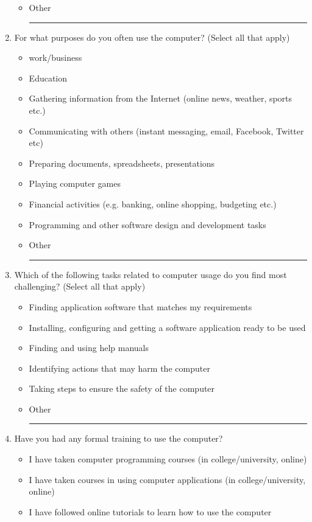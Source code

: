 \begin{enumerate}[topsep=-4em]
\begin{itemize}[topsep=-6em, label={o}]
\item Other \rule{4cm}{0.4pt}
\end{itemize}
\item For what purposes do you often use the computer? (Select all that apply)
\begin{itemize}[topsep=-6em, label={o}]
\itemsep-1em 
\item work/business
\item Education
\item Gathering information from the Internet (online news, weather, sports etc.)
\item Communicating with others (instant messaging, email, Facebook, Twitter etc)
\item Preparing documents, spreadsheets, presentations
\item Playing computer games
\item Financial activities (e.g. banking, online shopping, budgeting etc.)
\item Programming and other software design and development tasks
\item Other \rule{4cm}{0.4pt}
\end{itemize}
\item Which of the following tasks related to computer usage do you find most challenging? (Select all that apply)
\begin{itemize}[topsep=-6em, label={o}]
\itemsep-1em 
\item Finding application software that matches my requirements
\item Installing, configuring and getting a software application ready to be used
\item Finding and using help manuals
\item Identifying actions that may harm the computer
\item Taking steps to ensure the safety of the computer
\item Other \rule{4cm}{0.4pt}
\end{itemize}
\item Have you had any formal training to use the computer?
\begin{itemize}[topsep=-6em, label={o}]
\itemsep-1em 
\item I have taken computer programming courses (in college/university, online)
\item I have taken courses in using computer applications (in college/university, online)
\item I have followed online tutorials to learn how to use the computer

\end{itemize}
\end{enumerate}
